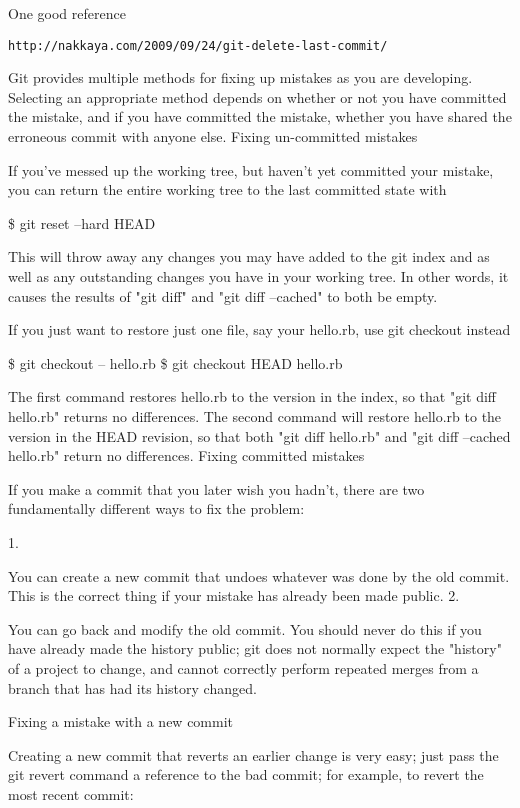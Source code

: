 \documentclass[a4paper,10pt]{article}
\begin{document}
One good reference

\begin{verbatim}
http://nakkaya.com/2009/09/24/git-delete-last-commit/
\end{verbatim}
Git provides multiple methods for fixing up mistakes as you are developing. Selecting an appropriate method depends on whether or not you have committed the mistake, and if you have committed the mistake, whether you have shared the erroneous commit with anyone else.
Fixing un-committed mistakes

If you've messed up the working tree, but haven't yet committed your mistake, you can return the entire working tree to the last committed state with

\$ git reset --hard HEAD

This will throw away any changes you may have added to the git index and as well as any outstanding changes you have in your working tree. In other words, it causes the results of "git diff" and "git diff --cached" to both be empty.

If you just want to restore just one file, say your hello.rb, use git checkout instead

\$ git checkout -- hello.rb
\$ git checkout HEAD hello.rb

The first command restores hello.rb to the version in the index, so that "git diff hello.rb" returns no differences. The second command will restore hello.rb to the version in the HEAD revision, so that both "git diff hello.rb" and "git diff --cached hello.rb" return no differences.
Fixing committed mistakes

If you make a commit that you later wish you hadn't, there are two fundamentally different ways to fix the problem:

1.

You can create a new commit that undoes whatever was done by the old commit. This is the correct thing if your mistake has already been made public.
2.

You can go back and modify the old commit. You should never do this if you have already made the history public; git does not normally expect the "history" of a project to change, and cannot correctly perform repeated merges from a branch that has had its history changed.

Fixing a mistake with a new commit

Creating a new commit that reverts an earlier change is very easy; just pass the git revert command a reference to the bad commit; for example, to revert the most recent commit:
\end{document}
